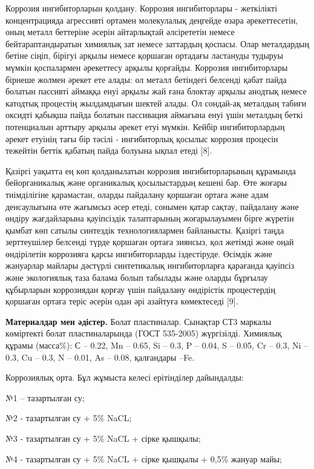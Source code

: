 Коррозия ингибиторларын қолдану. Коррозия ингибиторлары - жеткілікті
концентрацияда агрессивті ортамен молекулалық деңгейде өзара
әрекеттесетін, оның металл беттеріне әсерін айтарлықтай әлсірететін
немесе бейтараптандыратын химиялық зат немесе заттардың қоспасы. Олар
металдардың бетіне сіңіп, бірігуі арқылы немесе қоршаған ортадағы
ластануды тудыруы мүмкін қоспалармен әрекеттесу арқылы қорғайды.
Коррозия ингибиторлары бірнеше жолмен әрекет ете алады: ол металл
бетіндегі белсенді қабат пайда болатын пассивті аймаққа енуі арқылы жай
ғана блоктау арқылы анодтық немесе катодтық процестің жылдамдығын шектей
алады. Ол сондай-ақ металдың табиғи оксидті қабықша пайда болатын
пассивация аймағына енуі үшін металдың беткі потенциалын арттыру арқылы
әрекет етуі мүмкін. Кейбір ингибиторлардың әрекет етуінің тағы бір
тәсілі - ингибиторлық қосылыс коррозия процесін тежейтін беттік қабатың
пайда болуына ықпал етеді {[}8{]}.

Қазіргі уақытта ең көп қолданылатын коррозия ингибиторларының құрамында
бейорганикалық және органикалық қосылыстардың кешені бар. Өте жоғары
тиімділігіне қарамастан, оларды пайдалану қоршаған ортаға және адам
денсаулығына өте жағымсыз әсер етеді, сонымен қатар сақтау, пайдалану
және өндіру жағдайларына қауіпсіздік талаптарының жоғарылауымен бірге
жүретін қымбат көп сатылы синтездік технологиялармен байланысты. Қазіргі
таңда зерттеушілер белсенді түрде қоршаған ортаға зиянсыз, қол жетімді
және оңай өндірілетін коррозияға қарсы ингибиторларды іздестіруде.
Өсімдік және жануарлар майлары дәстүрлі синтетикалық ингибиторларға
қарағанда қауіпсіз және экологиялық таза балама болып табылады және
оларды бұрғылау құбырларын коррозиядан қорғау үшін пайдалану өндірістік
процестердің қоршаған ортаға теріс әсерін одан әрі азайтуға көмектеседі
{[}9{]}.

{\bfseries Материалдар мен әдістер.} Болат пластиналар. Сынақтар СТ3
маркалы көміртекті болат пластиналарында (ГОСТ 535-2005) жүргізілді.
Химиялық құрамы (масса\%): С -- 0.22, Mn -- 0.65, Si -- 0.3, P -- 0.04,
S -- 0.05, Cr -- 0.3, Ni -- 0.3, Cu -- 0.3, N -- 0.01, As -- 0.08,
қалғандары --Fe.

Коррозиялық орта. Бұл жұмыста келесі ерітінділер дайындалды:

№1 -- тазартылған су;

№2 - тазартылған су + 5\% NaCL;

№3 - тазартылған су + 5\% NaCL + сірке қышқылы;

№4 - тазартылған су + 5\% NaCL + сірке қышқылы + 0,5\% жануар майы;

